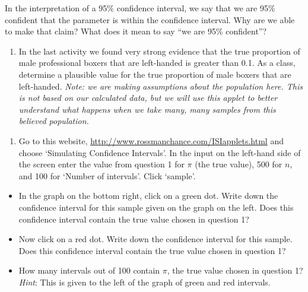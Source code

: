 \documentclass[
]{report}
\providecommand{\tightlist}{%
  \setlength{\itemsep}{0pt}\setlength{\parskip}{0pt}}
\begin{document}
In the interpretation of a 95\% confidence interval, we say that we are 95\% confident that the parameter is within the confidence interval. Why are we able to make that claim? What does it mean to say ``we are 95\% confident''?

\begin{enumerate}
\def\labelenumi{\arabic{enumi}.}
\tightlist
\item
  In the last activity we found very strong evidence that the true proportion of male professional boxers that are left-handed is greater than 0.1. As a class, determine a plausible value for the true proportion of male boxers that are left-handed. \emph{Note: we are making assumptions about the population here. This is not based on our calculated data, but we will use this applet to better understand what happens when we take many, many samples from this believed population.}
\end{enumerate}

\vspace{0.2in}

\begin{enumerate}
\def\labelenumi{\arabic{enumi}.}
\setcounter{enumi}{1}
\tightlist
\item
  Go to this website, \url{http://www.rossmanchance.com/ISIapplets.html} and choose `Simulating Confidence Intervals'. In the input on the left-hand side of the screen enter the value from question 1 for \(\pi\) (the true value), 500 for \(n\), and 100 for `Number of intervals'. Click `sample'.
\end{enumerate}

\vspace{1mm}

\begin{itemize}
\tightlist
\item
  In the graph on the bottom right, click on a green dot. Write down the confidence interval for this sample given on the graph on the left. Does this confidence interval contain the true value chosen in question 1?
\end{itemize}

\vspace{0.4in}

\begin{itemize}
\item
  Now click on a red dot. Write down the confidence interval for this sample. Does this confidence interval contain the true value chosen in question 1?
  \vspace{0.5in}
\item
  How many intervals out of 100 contain \(\pi\), the true value chosen in question 1? \emph{Hint}: This is given to the left of the graph of green and red intervals.
  \vspace{0.4in}
\end{itemize}
\end{document}

